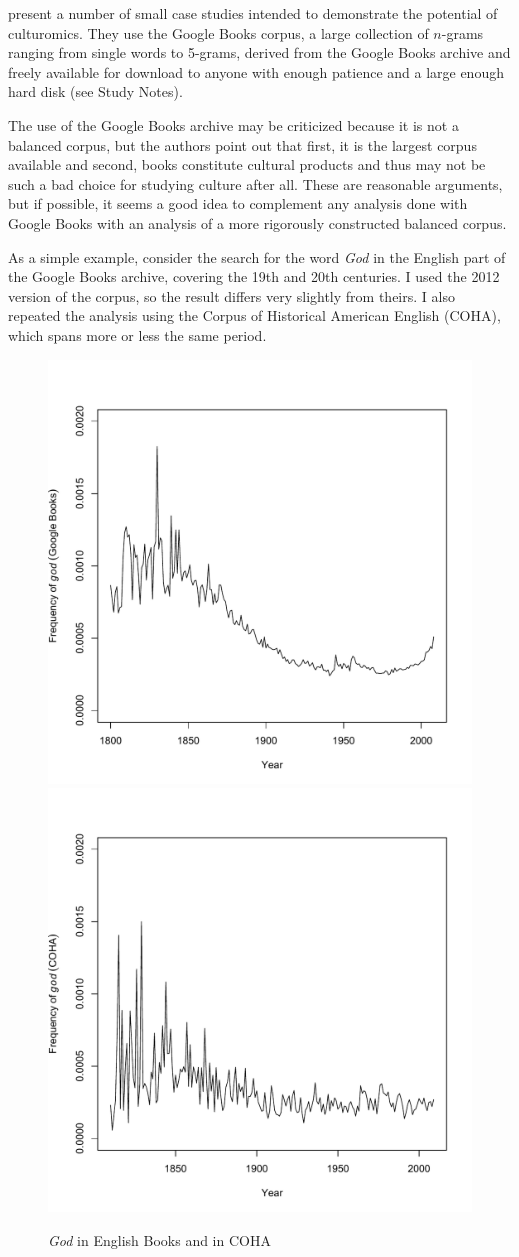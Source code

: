 \citet{michel_quantitative_2011} present a number of small case studies intended to demonstrate the potential of culturomics.  They use the Google Books corpus, a large collection of $n$\hyp{}grams  ranging from single words to 5\hyp{}grams, derived from the Google Books archive and freely available for download to anyone with enough patience and a large enough hard disk (see Study Notes).

The use of the Google Books archive may be criticized because it is not a balanced corpus, but the authors point out that first, it is the largest  corpus available and second, books constitute cultural  products and thus may not be such a bad choice for studying culture after all. These are reasonable arguments, but if possible, it seems a good idea to complement any analysis done with Google Books with an analysis of a more rigorously constructed balanced corpus.

As a simple example, consider the search for the word \textit{God} in the English part of the Google Books archive, covering the 19th and 20th centuries. I used the 2012 version of the corpus, so the result differs very slightly from theirs. I also repeated the analysis using the Corpus of Historical American English (COHA),  which spans more or less the same period.

\begin{figure}
\caption{\textit{God} in English Books and in COHA\label{fig:demiseofgod}}
\includegraphics[width=.5\linewidth]{figures/demiseofgodgoogle}%
\includegraphics[width=.5\linewidth]{figures/demiseofgodcoha}%
\end{figure}

